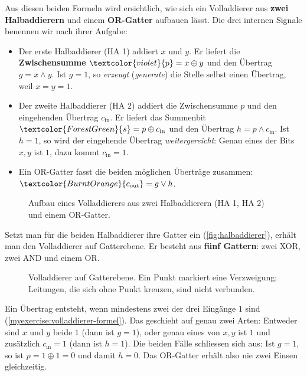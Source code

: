 Aus diesen beiden Formeln wird ersichtlich, wie sich ein Volladdierer aus \textbf{zwei Halbaddierern} und einem \textbf{OR-Gatter} aufbauen lässt. Die drei internen Signale benennen wir nach ihrer Aufgabe:
\begin{itemize}
    \item Der erste Halbaddierer (HA 1) addiert $x$ und $y$. Er liefert die \textbf{Zwischensumme} $\textcolor{violet}{p} = x \oplus y$ und den Übertrag $g = x \land y$. Ist $g = 1$, so \emph{erzeugt} (\textit{generate}) die Stelle selbst einen Übertrag, weil $x = y = 1$.
    \item Der zweite Halbaddierer (HA 2) addiert die Zwischensumme $p$ und den eingehenden Übertrag $c_{\text{in}}$. Er liefert das Summenbit $\textcolor{ForestGreen}{s} = p \oplus c_{\text{in}}$ und den Übertrag $h = p \land c_{\text{in}}$. Ist $h = 1$, so wird der eingehende Übertrag \emph{weitergereicht}: Genau eines der Bits $x, y$ ist $1$, dazu kommt $c_{\text{in}} = 1$.
    \item Ein OR-Gatter fasst die beiden möglichen Überträge zusammen: $\textcolor{BurntOrange}{c_{\text{out}}} = g \lor h$.
\end{itemize}

\begin{figure}[H]
    \centering
    
    \caption{Aufbau eines Volladdierers aus zwei Halbaddierern (HA 1, HA 2) und einem OR-Gatter.}
    \label{fig:volladdierer_block}
\end{figure}

Setzt man für die beiden Halbaddierer ihre Gatter ein (\cref{fig:halbaddierer}), erhält man den Volladdierer auf Gatterebene. Er besteht aus \textbf{fünf Gattern}: zwei XOR, zwei AND und einem OR.

\begin{figure}[H]
    \centering
    
    \caption{Volladdierer auf Gatterebene. Ein Punkt markiert eine Verzweigung; Leitungen, die sich ohne Punkt kreuzen, sind nicht verbunden.}
    \label{fig:volladdierer_gatter}
\end{figure}

\begin{myremark}[Warum genügt $c_{\text{out}} = g \lor h$?]
    Ein Übertrag entsteht, wenn mindestens zwei der drei Eingänge $1$ sind (\cref{myexercise:volladdierer-formel}). Das geschieht auf genau zwei Arten: Entweder sind $x$ und $y$ beide $1$ (dann ist $g = 1$), oder genau eines von $x, y$ ist $1$ und zusätzlich $c_{\text{in}} = 1$ (dann ist $h = 1$). Die beiden Fälle schliessen sich aus: Ist $g = 1$, so ist $p = 1 \oplus 1 = 0$ und damit $h = 0$. Das OR-Gatter erhält also nie zwei Einsen gleichzeitig.
\end{myremark}

